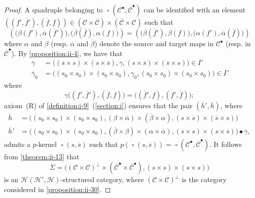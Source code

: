 \documentclass[a4paper,fleqn]{article}
\theoremstyle{plain}
\theoremstyle{definition}
\newcommand{\CC}{\mathcal{C}}
\newcommand{\HH}{\mathcal{H}}
\DeclareMathOperator{\sq}{\square}
\begin{document}
\begin{proof}
  A quadruple belonging to $\sq(\CC^\bullet,\overline{\CC}^\bullet)$ can be identified with an element $((f',\overline{f}'),(\overline{f},f))\in(\CC\times\overline{\CC})\times(\overline{\CC}\times\CC)$ such that
  \[
    \left(
      \big(\beta(f'),\overline{\alpha}(\overline{f}')\big),
      \big(\overline{\beta}(\overline{f}),\alpha(f)\big)
    \right)
    =
    \left(
      \big(\overline{\beta}(\overline{f}'),\beta(f)\big),
      \big(\alpha(f'),\overline{\alpha}(\overline{f})\big)
    \right)
  \]
  where $\alpha$ and $\beta$ (resp. $\overline{\alpha}$ and $\overline{\beta}$) denote the source and target maps in $\CC^\bullet$ (resp. in $\overline{\CC}^\bullet$).
  By \cref{proposition:ii-4}, we have that
  \[
    \begin{aligned}
      \overline{\gamma}
      &= \big(
        (\overline{s}\times s)\times(s\times\overline{s}),
        \gamma,
        (s\times\overline{s})\times(\overline{s}\times s)
      \big)
      \in\Gamma
    \\\overline{\gamma}_0
      &= \big(
        (s_0\times s_0)\times(s_0\times s_0),
        \gamma_0,
        (s_0\times s_0)\times(s_0\times s_0)
      \big)
      \in\Gamma
    \end{aligned}
  \]
  where
  \[
    \gamma\big((f',\overline{f}'),(\overline{f},f)\big)
    = \big((\overline{f}',f),(f',\overline{f})\big);
  \]
  axiom~(R) of \cref{definition:i-9}~(\cref{section:i}) ensures that the pair $(\overline{h}',\overline{h})$, where
  \[
    \begin{aligned}
      \overline{h}
      &= \big(
        (s_0\times s_0)\times(s_0\times s_0),
        (\beta\times\overline{\alpha})\times(\overline{\beta}\times\alpha),
        (s\times\overline{s})\times(\overline{s}\times s)
      \big)
    \\\overline{h}'
      &= \big(
        (s_0\times s_0)\times(s_0\times s_0),
        (\overline{\beta}\times\beta)\times(\alpha\times\overline{\alpha}),
        (\overline{s}\times s)\times(s\times\overline{s})
      \big)\bullet\overline{\gamma},
    \end{aligned}
  \]
  admits a $p$-kernel $\sq(s,\overline{s})$ such that $p(\sq(s,\overline{s}))=\sq(\CC^\bullet,\overline{\CC}^\bullet)$.
  It follows from \cref{theorem:ii-13} that
  \[
    \Sigma
    = \big(
      (\CC\times\CC)^\perp\times(\overline{\CC}^\bullet\times\overline{\CC}^\bullet),
      (s\times s)\times(s\times s)
    \big)
  \]
  is an $\HH(\HH',\HH)$-structured category, where $(\CC\times\CC)^\perp$ is the category considered in \cref{proposition:ii-30}.

\end{proof}
\end{document}
